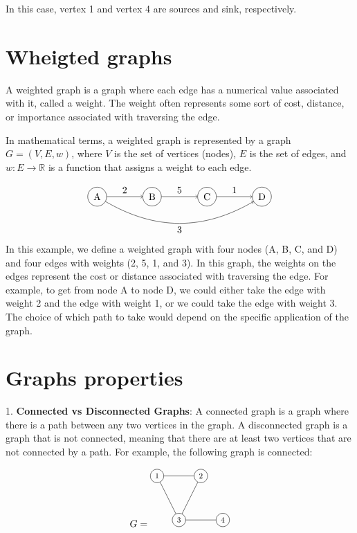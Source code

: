 In this case, vertex 1 and vertex 4 are sources and sink, respectively.

\section{Wheigted graphs}

A weighted graph is a graph where each edge has a numerical value associated with it, called a weight. The weight often represents some sort of cost, distance, or importance associated with traversing the edge.

In mathematical terms, a weighted graph is represented by a graph $G = (V, E, w)$, where $V$ is the set of vertices (nodes), $E$ is the set of edges, and $w :  E \rightarrow \mathbb{R}$ is a function that assigns a weight to each edge.

\[\begin{tikzpicture}
  \node[circle, draw] (A) at (0,0) {A};
  \node[circle, draw] (B) at (2,0) {B};
  \node[circle, draw] (C) at (4,0) {C};
  \node[circle, draw] (D) at (6,0) {D};
  \draw[->] (A) -- node[above] {2} (B);
  \draw[->] (B) -- node[above] {5} (C);
  \draw[->] (C) -- node[above] {1} (D);
  \draw[->] (A) to[bend right] node[below] {3} (D);
\end{tikzpicture}\]
In this example, we define a weighted graph with four nodes (A, B, C, and D) and four edges with weights (2, 5, 1, and 3). 
In this graph, the weights on the edges represent the cost or distance associated with traversing the edge. For example, to get from node A to node D, we could either take the edge with weight 2 and the edge with weight 1, or we could take the edge with weight 3. The choice of which path to take would depend on the specific application of the graph.

\section{Graphs properties}

1. {\bf Connected vs Disconnected Graphs}: A connected graph is a graph where there is a path between any two vertices in the graph. A disconnected graph is a graph that is not connected, meaning that there are at least two vertices that are not connected by a path. For example, the following graph is connected:

\[
G = \begin{tikzpicture}[scale=0.8, transform shape]
\node[shape=circle,draw=black] (1) at (0,2) {1};
\node[shape=circle,draw=black] (2) at (2,2) {2};
\node[shape=circle,draw=black] (3) at (1,0) {3};
\node[shape=circle,draw=black] (4) at (3,0) {4};
\draw[-] (1) -- (2);
\draw[-] (1) -- (3);
\draw[-] (2) -- (3);
\draw[-] (3) -- (4);
\end{tikzpicture}
\]

